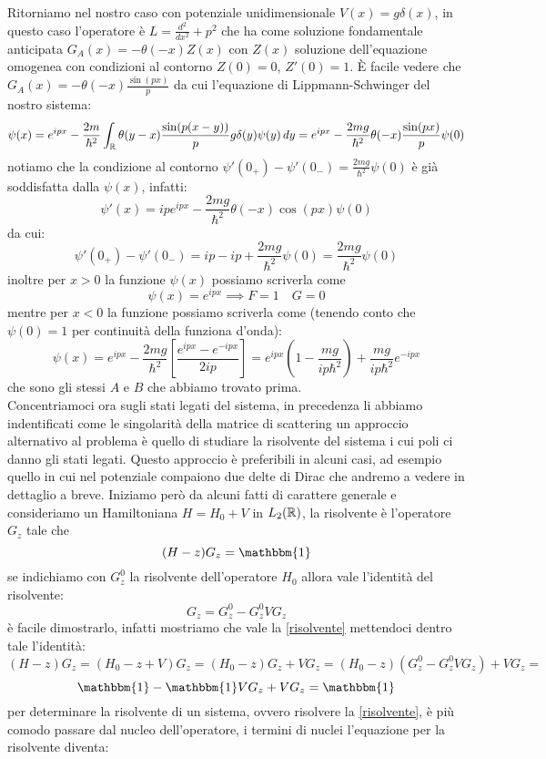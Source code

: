  Ritorniamo nel nostro caso con potenziale unidimensionale $V(x) = g\delta(x)$, in questo caso l'operatore è $L = \frac{d^2}{dx^2} + p^2$ che ha come soluzione fondamentale anticipata $G_A(x) = -\theta(-x)Z(x)$ con $Z(x)$ soluzione dell'equazione omogenea con condizioni al contorno $Z(0) = 0$, $Z'(0)=1$. È facile vedere che $G_A(x) = -\theta(-x)\frac{\sin(px)}{p}$ da cui l'equazione di Lippmann-Schwinger del nostro sistema:
 \[\psi(x) = e^{ipx} -\frac{2m}{\hbar^2}\int_{\mathbb{R}} \theta(y-x)\frac{\sin(p(x-y))}{p} g\delta(y)\psi(y)\,dy = e^{ipx} -\frac{2mg}{\hbar^2}\theta(-x)\frac{\sin(px)}{p} \psi(0)\]
 notiamo che la condizione al contorno $\psi'(0_+) - \psi'(0_-) = \frac{2mg}{\hbar^2}\psi(0)$ è già soddisfatta dalla $\psi(x)$, infatti:
 \[\psi'(x) = ip e^{ipx} -\frac{2mg}{\hbar^2}\theta(-x)\cos(px)\psi(0)\]
 da cui:
 \[\psi'(0_+) - \psi'(0_-) = ip -ip +\frac{2mg}{\hbar^2}\psi(0) =  \frac{2mg}{\hbar^2}\psi(0)\]
inoltre per $x>0$ la funzione $\psi(x)$ possiamo scriverla come
\[\psi(x) = e^{ipx} \implies F=1\quad G=0\]
mentre per $x<0$ la funzione possiamo scriverla come (tenendo conto che $\psi(0) = 1$ per continuità della funziona d'onda):
\[\psi(x) = e^{ipx} -\frac{2mg}{\hbar^2}\left[\frac{e^{ipx} - e^{-ipx}}{2ip}\right] =e^{ipx} \left(1-\frac{mg}{ip\hbar^2}\right) + \frac{mg}{ip\hbar^2} e^{-ipx}   \]
che sono gli stessi $A$ e $B$ che abbiamo trovato prima.\\
Concentriamoci ora sugli stati legati del sistema, in precedenza li abbiamo indentificati come le singolarità della matrice di scattering un approccio alternativo al problema è quello di studiare la risolvente del sistema i cui poli ci danno gli stati legati. Questo approccio è preferibili in alcuni casi, ad esempio quello in cui nel potenziale compaiono due delte di Dirac che andremo a vedere in dettaglio a breve. Iniziamo però da alcuni fatti di carattere generale e consideriamo un Hamiltoniana $H =H_0 + V$ in $L_2(\mathbb{R})$, la risolvente è l'operatore $G_z$ tale che 
\begin{equation}\label{risolvente} (H-z)G_z = \mathbbm{1}\end{equation}
se indichiamo con $G_z^0$ la risolvente dell'operatore $H_0$ allora vale l'identità del risolvente:
\[G_z = G_z^0 - G_z^0VG_z\]
è facile dimostrarlo, infatti mostriamo che vale la \eqref{risolvente} mettendoci dentro tale l'identità:
\[(H-z)G_z = (H_0-z+V)G_z = (H_0-z)G_z + VG_z = (H_0 -z)(G_z^0-G_z^0VG_z) + VG_z = \]
\[\mathbbm{1} - \mathbbm{1}VG_z + VG_z = \mathbbm{1}\]
per determinare la risolvente di un sistema, ovvero risolvere la \eqref{risolvente}, è più comodo passare dal nucleo dell'operatore, i termini di nuclei l'equazione per la risolvente diventa:
